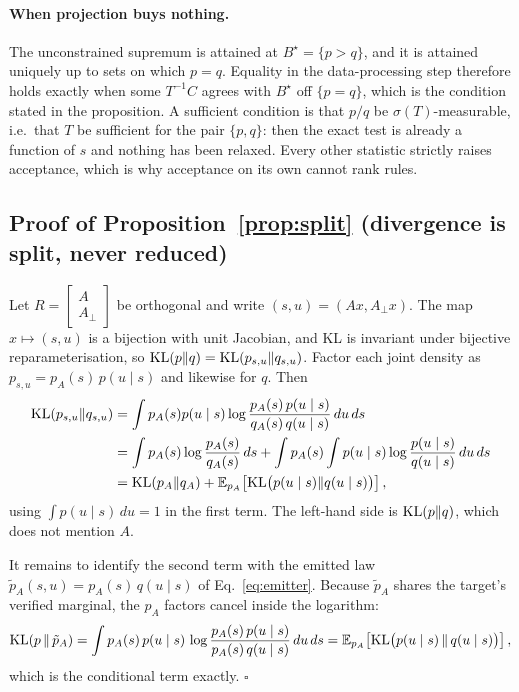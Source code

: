 \paragraph{When projection buys nothing.} The unconstrained supremum is attained at $B^\star = \{p >
q\}$, and it is attained uniquely up to sets on which $p = q$. Equality in the data-processing step
therefore holds exactly when some $T^{-1}C$ agrees with $B^\star$ off $\{p = q\}$, which is the
condition stated in the proposition. A sufficient condition is that $p/q$ be $\sigma(T)$-measurable,
i.e.\ that $T$ be sufficient for the pair $\{p, q\}$: then the exact test is already a function of
$s$ and nothing has been relaxed. Every other statistic strictly raises acceptance, which is why
acceptance on its own cannot rank rules.

\subsection{Proof of Proposition~\ref{prop:split} (divergence is split, never reduced)}

Let $R = \left[\begin{smallmatrix} A \\ A_\perp\end{smallmatrix}\right]$ be orthogonal and write
$(s, u) = (Ax, A_\perp x)$. The map $x \mapsto (s,u)$ is a bijection with unit Jacobian, and KL is
invariant under bijective reparameterisation, so $\operatorname{KL}(p \| q) = \operatorname{KL}(p_{s,u} \| q_{s,u})$. Factor each
joint density as $p_{s,u} = p_A(s)\, p(u \mid s)$ and likewise for $q$. Then
\begin{align*}
\operatorname{KL}(p_{s,u} \| q_{s,u})
&= \int p_A(s) p(u\mid s) \log \frac{p_A(s)\,p(u\mid s)}{q_A(s)\,q(u\mid s)} \, du \, ds \\
&= \int p_A(s) \log\frac{p_A(s)}{q_A(s)} \, ds
 + \int p_A(s) \int p(u \mid s) \log \frac{p(u\mid s)}{q(u \mid s)} \, du \, ds \\
&= \operatorname{KL}(p_A \| q_A) + \mathbb{E}_{p_A}\!\left[\operatorname{KL}\bigl(p(u\mid s) \| q(u \mid s)\bigr)\right],
\end{align*}
using $\int p(u\mid s)\,du = 1$ in the first term. The left-hand side is $\operatorname{KL}(p\|q)$, which does not
mention $A$.

It remains to identify the second term with the emitted law $\tilde{p}_A(s,u) = p_A(s)\,q(u\mid s)$
of Eq.~\ref{eq:emitter}. Because $\tilde{p}_A$ shares the target's verified marginal, the $p_A$
factors cancel inside the logarithm:
\[
\operatorname{KL}(p \,\|\, \tilde{p}_A)
= \int p_A(s)\,p(u \mid s)\, \log \frac{p_A(s)\,p(u\mid s)}{p_A(s)\,q(u \mid s)}\, du\, ds
= \mathbb{E}_{p_A}\!\left[\operatorname{KL}\bigl(p(u\mid s) \,\|\, q(u \mid s)\bigr)\right],
\]
which is the conditional term exactly. $\square$

